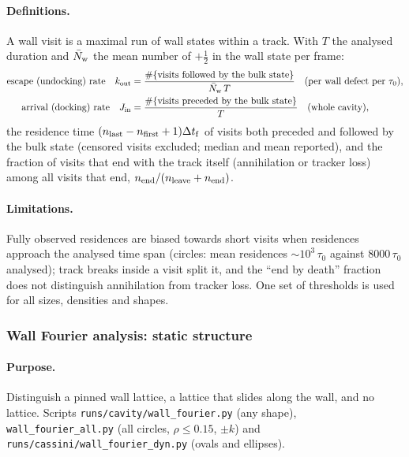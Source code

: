 \paragraph{Definitions.} A wall visit is a maximal run of wall states within a track. With $T$ the analysed duration and
$\bar N_{\rm w}$ the mean number of $+\tfrac12$ in the wall state per frame:
\begin{align}
  \text{escape (undocking) rate}\quad k_{\rm out}&=\frac{\#\{\text{visits followed by the bulk state}\}}{\bar N_{\rm w}\,T}
  \quad\text{(per wall defect per }\tau_0),\\
  \text{arrival (docking) rate}\quad J_{\rm in}&=\frac{\#\{\text{visits preceded by the bulk state}\}}{T}\quad\text{(whole cavity)},
\end{align}
the residence time $(n_{\rm last}-n_{\rm first}+1)\Delta t_{\rm f}$ of visits both preceded and followed by the bulk state (censored visits
excluded; median and mean reported), and the fraction of visits that end with the track itself (annihilation or tracker loss) among all
visits that end, $n_{\rm end}/(n_{\rm leave}+n_{\rm end})$.

\paragraph{Limitations.} Fully observed residences are biased towards short visits when residences approach the analysed time span
(circles: mean residences $\sim10^3\,\tau_0$ against $8000\,\tau_0$ analysed); track breaks inside a visit split it, and the
``end by death'' fraction does not distinguish annihilation from tracker loss. One set of thresholds is used for all sizes, densities and
shapes.

\subsubsection{Wall Fourier analysis: static structure}
\label{sec:md-fourier-static}

\paragraph{Purpose.} Distinguish a pinned wall lattice, a lattice that slides along the wall, and no lattice. Scripts
\texttt{runs/cavity/wall\_fourier.py} (any shape), \texttt{wall\_fourier\_all.py} (all circles, $\rho\le0.15$, $\pm k$) and
\texttt{runs/cassini/wall\_fourier\_dyn.py} (ovals and ellipses).

